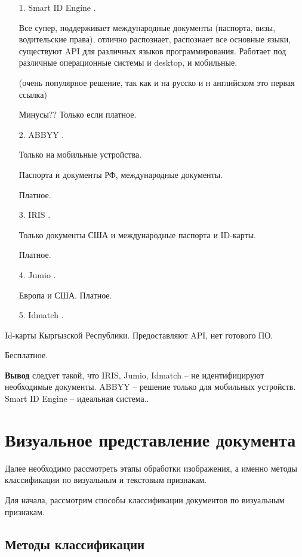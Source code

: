 \begin{enumerate}
\item[1.] Smart ID Engine \cite{smartengine}.

Все супер, поддерживает международные документы (паспорта, визы, водительские права), отлично распознает, распознает все основные языки, существуют API для различных языков программирования. Работает под различные операционные системы и desktop, и мобильные. 

(очень популярное решение, так как и на русско и н английском это первая ссылка)

Минусы??
Только если платное.

\item[2.] ABBYY \cite{abbyy}.

Только на мобильные устройства.

Паспорта и документы РФ, международные документы.

Платное.

\item[3.] IRIS \cite{iris}.

Только документы США и международные паспорта и ID-карты. 

Платное.

\item[4.] Jumio \cite{jumio}.

Европа и США. Платное.

\item[5.] Idmatch \cite{idmatch}.
\end{enumerate}

Id-карты Кыргызской Республики. Предоставляют API, нет готового ПО.

Бесплатное.

\textbf{Вывод} следует такой, что IRIS, Jumio, Idmatch -- не идентифицируют необходимые документы. ABBYY -- решение только для мобильных устройств. Smart ID Engine -- идеальная система..

\section{Визуальное представление документа}

Далее необходимо рассмотреть этапы обработки изображения, а именно методы классификации по визуальным и текстовым признакам.

Для начала, рассмотрим способы классификации документов по визуальным признакам.

\subsection{Методы классификации}

